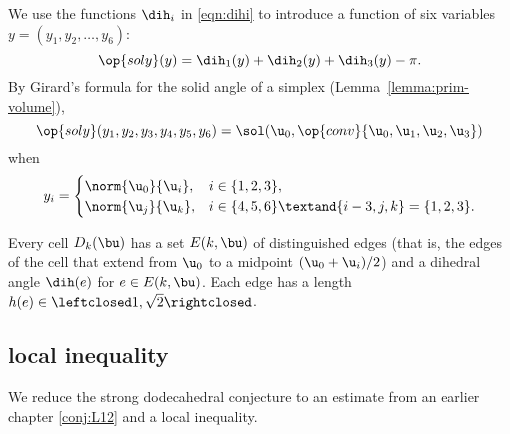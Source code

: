 We use the functions $\dih_i$ in
\eqref{eqn:dihi} to introduce a function of six variables $y=(y_1,y_2,\ldots,y_6)$:
\[
\op{soly}(y)=
\dih_1(y)+\dih_2(y)+\dih_3(y)-\pi.
\]
By Girard's formula for the solid angle of a simplex 
(Lemma~\ref{lemma:prim-volume}),
\[
\op{soly}(y_1,y_2,y_3,y_4,y_5,y_6)=
\sol(\u_0,\op{conv}\{\u_0,\u_1,\u_2,\u_3\})
\]
when
\[
y_i = \begin{cases}
\norm{\u_0}{\u_i}, & i\in\{1,2,3\},\\
\norm{\u_j}{\u_k}, & i\in\{4,5,6\}\textand\{i-3,j,k\} = \{1,2,3\}.\\
\end{cases}
\]
%
%
%
%


Every cell $D_k(\bu)$ has a set $E(k,\bu)$ of distinguished edges
(that is, the edges of the cell that extend from $\u_0$ to a midpoint $(\u_0+\u_i)/2$) and a
dihedral angle $\dih(e)$ for $e\in E(k,\bu)$.  Each edge has a length
$h(e)\in\leftclosed1,\sqrt2\rightclosed$.  %
%
%

\subsection{local inequality}

We reduce the strong dodecahedral conjecture to an estimate from an earlier
chapter \eqref{conj:L12} and a
local inequality.  



